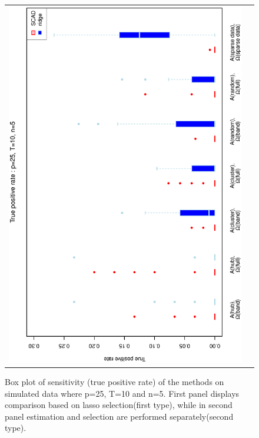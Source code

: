 \documentclass[a4paper]{article}
\begin{document}
\begin{figure}[h!]
\begin{tabular}{cc}
\includegraphics[scale=0.5,angle=270]{ROCtpr25T10N5b.eps}\\
\end{tabular}
\caption{Box plot of sensitivity (true positive rate) of the methods on simulated data where p=25, T=10 and n=5. First panel displays comparison based on lasso selection(first type), while in second panel estimation and selection are performed separately(second type).}
\label{fig:tpr25T10N5}
\end{figure}
\end{document}

